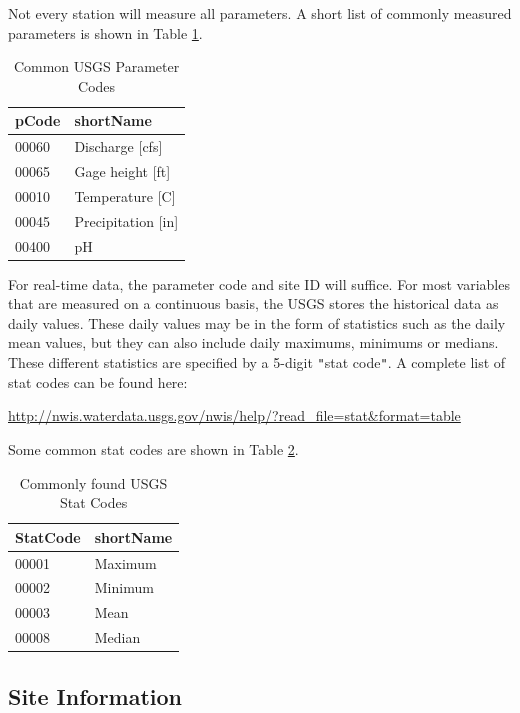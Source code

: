 \documentclass[a4paper,11pt]{article}
\begin{document}
Not every station will measure all parameters. A short list of commonly measured parameters is shown in Table \ref{tab:params}.



\begin{table}[!ht]
\centering
\caption{Common USGS Parameter Codes} 
\label{tab:params}
\begin{tabular}{ll}
  \hline
pCode & shortName \\ 
  \hline
00060 & Discharge [cfs] \\ 
  00065 & Gage height [ft] \\ 
  00010 & Temperature [C] \\ 
  00045 & Precipitation [in] \\ 
  00400 & pH \\ 
   \hline
\end{tabular}
\end{table}
For real-time data, the parameter code and site ID will suffice.  For most variables that are measured on a continuous basis, the USGS stores the historical data as daily values.  These daily values may be in the form of statistics such as the daily mean values, but they can also include daily maximums, minimums or medians.  These different statistics are specified by a 5-digit \texttt{"}stat code\texttt{"}.  A complete list of stat codes can be found here:

\url{http://nwis.waterdata.usgs.gov/nwis/help/?read_file=stat&format=table}

Some common stat codes are shown in Table \ref{tab:stat}.
\begin{table}[!ht]
\centering
\caption{Commonly found USGS Stat Codes} 
\label{tab:stat}
\begin{tabular}{ll}
  \hline
StatCode & shortName \\ 
  \hline
00001 & Maximum \\ 
  00002 & Minimum \\ 
  00003 & Mean \\ 
  00008 & Median \\ 
   \hline
\end{tabular}
\end{table}
\FloatBarrier
\subsection{Site Information}
\label{sec:usgsSite}
\end{document}

